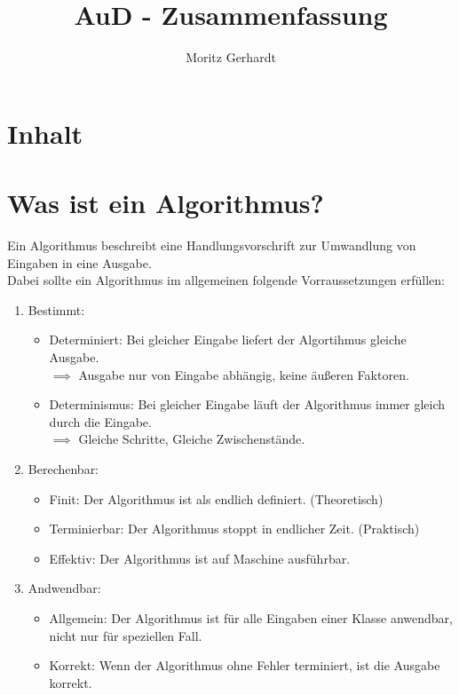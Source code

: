 \documentclass[ngerman,
color=3b,
load_common, %
boxarc,
main,
tikz,
border=3mm
]{article}
\title{AuD - Zusammenfassung} %
\author{Moritz Gerhardt } %
\date{} %
\begin{document}
\maketitle
\section{Inhalt}
\tableofcontents

\newpage

\section{Was ist ein Algorithmus?}
Ein Algorithmus beschreibt eine Handlungsvorschrift zur Umwandlung von Eingaben in eine Ausgabe.\\
Dabei sollte ein Algorithmus im allgemeinen folgende Vorraussetzungen erfüllen:
\begin{enumerate}
    \item Bestimmt:
    \begin{itemize}
        \item Determiniert: Bei gleicher Eingabe liefert der Algortihmus gleiche Ausgabe. \\$\implies$ Ausgabe nur von Eingabe abhängig, keine äußeren Faktoren.
        \item Determinismus: Bei gleicher Eingabe läuft der Algorithmus immer gleich durch die Eingabe. \\$\implies$ Gleiche Schritte, Gleiche Zwischenstände.
    \end{itemize}
    \item Berechenbar:
    \begin{itemize}
        \item Finit: Der Algorithmus ist als endlich definiert. (Theoretisch)
        \item Terminierbar: Der Algorithmus stoppt in endlicher Zeit. (Praktisch)
        \item Effektiv: Der Algorithmus ist auf Maschine ausführbar.
    \end{itemize}
    \item Andwendbar:
    \begin{itemize}
        \item Allgemein: Der Algorithmus ist für alle Eingaben einer Klasse anwendbar, nicht nur für speziellen Fall.
        \item Korrekt: Wenn der Algorithmus ohne Fehler terminiert, ist die Ausgabe korrekt.
    \end{itemize}
\end{enumerate}
\end{document}
